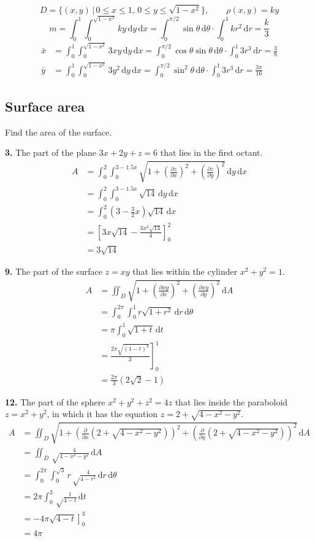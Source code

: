 \documentclass[a4paper,12pt]{article}
\newcommand{\ud}{\,\mathrm{d}}
\newcommand{\tho}[3][]{\frac{\partial #1 #2}{\partial #3 #1}}
\newcommand{\exercise}[1]{\noindent\textbf{#1.}}
\begin{document}
\[D = \{(x, y)\,|\,0\leq x\leq 1,\,0\leq y\leq\sqrt{1-x^2}\},\qquad
\rho(x, y) = ky\tag{11}\]
\[m = \int_0^1\int_0^{\sqrt{1-x^2}}ky\ud y\ud x
= \int_0^{\pi/2}\sin\theta\ud\theta\cdot\int_0^1 kr^2\ud r
= \frac{k}{3}\]
\begin{align*}
  \bar x &= \int_0^1\int_0^{\sqrt{1-x^2}}3xy\ud y\ud x
= \int_0^{\pi/2}\cos\theta\sin\theta\ud\theta\cdot\int_0^1 3r^3\ud r
  = \frac{3}{8}\\
  \bar y &= \int_0^1\int_0^{\sqrt{1-x^2}}3y^2\ud y\ud x
= \int_0^{\pi/2}\sin^2\theta\ud\theta\cdot\int_0^1 3r^3\ud r
= \frac{3\pi}{16}
\end{align*}

\subsection{Surface area}
Find the area of the surface.

\exercise{3} The part of the plane $3x + 2y + z = 6$
that lies in the first octant.
\begin{align*}
  A &= \int_0^2\int_0^{3-1.5x}\sqrt{1 + \left(\tho{z}{x}\right)^2
     + \left(\tho{z}{y}\right)^2}\ud y\ud x\\
    &= \int_0^2\int_0^{3-1.5x}\sqrt{14}\ud y\ud x\\
    &= \int_0^2\left(3 - \frac{3}{2}x\right)\sqrt{14}\ud x\\
    &= \left[3x\sqrt{14} - \frac{3x^2\sqrt{14}}{4}\right]_0^2\\
    &= 3\sqrt{14}
\end{align*}

\exercise{9} The part of the surface $z = xy$
that lies within the cylinder $x^2 + y^2 = 1$.
\begin{align*}
  A &= \iint_D\sqrt{1 + \left(\tho{xy}{x}\right)^2
     + \left(\tho{xy}{y}\right)^2}\ud A\\
    &= \int_0^{2\pi}\int_0^1 r\sqrt{1 + r^2}\ud r\ud\theta\\
    &= \pi\int_0^1\sqrt{1 + t}\ud t\\
    &= \left.\frac{2\pi\sqrt{(1 - t)^3}}{3}\right]_0^1\\
    &= \frac{2\pi}{3}\left(2\sqrt{2} - 1\right)
\end{align*}

\exercise{12} The part of the sphere $x^2 + y^2 + z^2 = 4z$
that lies inside the paraboloid $z = x^2 + y^2$,
in which it has the equation $z = 2 + \sqrt{4 - x^2 - y^2}$.
\begin{align*}
  A &= \iint_D\sqrt{1 + \left(\tho{}{x}\left(2 + \sqrt{4 - x^2 - y^2}\right)\right)^2
     + \left(\tho{}{y}\left(2 + \sqrt{4 - x^2 - y^2}\right)\right)^2}\ud A\\
    &= \iint_D\sqrt\frac{4}{4 - x^2 - y^2}\ud A\\
    &= \int_0^{2\pi}\int_0^{\sqrt 3}r\sqrt\frac{4}{4 - r^2}\ud r\ud\theta\\
    &= 2\pi\int_0^3\sqrt\frac{1}{4 - t}\ud t\\
    &= \left.-4\pi\sqrt{4 - t}\right]_0^3\\
    &= 4\pi
\end{align*}
\end{document}
